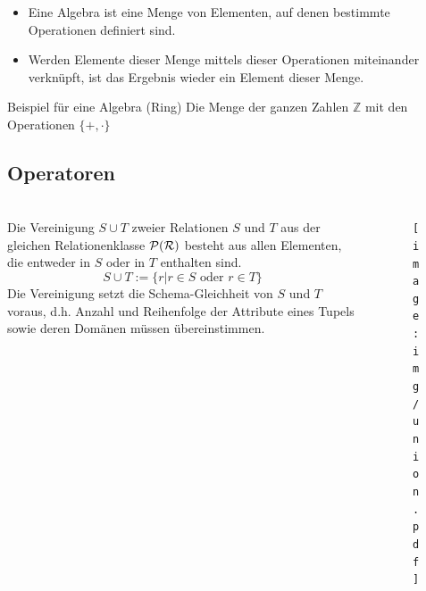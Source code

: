 \begin{frame}\frametitle{\insertsection}
\framesubtitle{\insertsubsection}
\onslide
\begin{itemize}
\item Eine Algebra ist eine Menge von Elementen, auf denen bestimmte Operationen definiert sind.
\item Werden Elemente dieser Menge mittels dieser Operationen miteinander verknüpft, ist das Ergebnis wieder
ein Element dieser Menge.
\end{itemize}
\pause
\begin{block}{Beispiel für eine Algebra (Ring)}
Die Menge der ganzen Zahlen $\mathbb{Z}$ mit den Operationen $\{+,\cdot\}$
\end{block}    		
\end{frame}

\subsection{Operatoren}

\begin{frame}\frametitle{\insertsection}
	\framesubtitle{\insertsubsection}
	\vspace{5mm}
	\begin{columns}
	\begin{column}{.58\textwidth}
	 Die Vereinigung $S\cup T$ zweier Relationen $S$ und  $T$ aus der gleichen Relationenklasse $\mathcal{P}(\mathcal{R})$ besteht aus allen Elementen, 
	 die entweder in $S$ oder in $T$ enthalten sind.
	 \begin{equation*}
	  S\cup T:=\{r|r\in S \text{ oder } r \in T\}
	 \end{equation*}
	 Die Vereinigung setzt die Schema-Gleichheit von $S$ und $T$ voraus, d.h. Anzahl und Reihenfolge der Attribute eines Tupels 
	 sowie deren Domänen müssen übereinstimmen.
  \end{column}
	\begin{column}{.33\textwidth}
	\begin{figure}
		\vspace{-1cm}
		\texttt{[image: img/union.pdf]}
   \end{figure}
   \end{column}
   \end{columns}
\end{frame}

